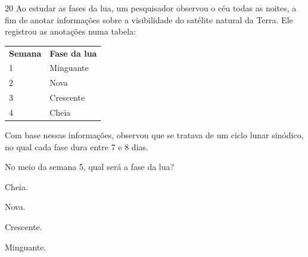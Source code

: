 \pagebreak
\num{20} Ao estudar as fases da lua, um pesquisador observou o céu
todas as noites, a fim de anotar informações sobre a visibilidade do
satélite natural da Terra. Ele registrou as anotações numa tabela:

\begin{longtable}[]{@{}ll@{}}
\toprule
\textbf{Semana} & \textbf{Fase da lua}\tabularnewline
1 & Minguante\tabularnewline
2 & Nova\tabularnewline
3 & Crescente\tabularnewline
4 & Cheia\tabularnewline
\bottomrule
\end{longtable}

Com base nessas informações, observou que se tratava de um ciclo lunar
sinódico, no qual cada fase dura entre 7 e 8 dias.

No meio da semana 5, qual será a fase da lua?

\begin{minipage}{.5\textwidth}
\begin{escolha}
\item Cheia.

\item Nova.

\item Crescente.

\item Minguante.
\end{escolha}
\end{minipage}


\pagebreak